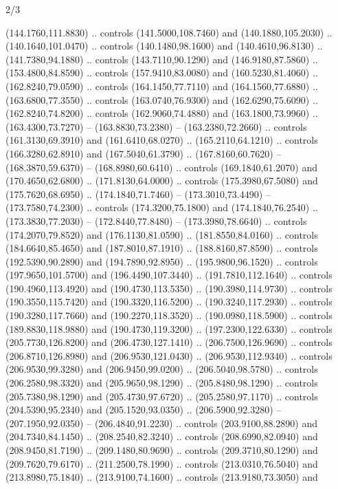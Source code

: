 \begin{flagdescription}{2/3}
\begin{scope}[xshift=0.5\flaglength,yshift=0.5\flagwidth,scale=\stretchfactor]
\begin{scope}[scale=0.001645\flagwidth,yshift=65mm,xshift=-63mm]
\begin{scope}[y=0.80pt, x=0.80pt, yscale=-1,]
\begin{scope}[cm={{1.33333,0.0,0.0,1.33333,(0.0,1e-05)}}]
  (144.1760,111.8830) .. controls (141.5000,108.7460) and (140.1880,105.2030) ..
  (140.1640,101.0470) .. controls (140.1480,98.1600) and (140.4610,96.8130) ..
  (141.7380,94.1880) .. controls (143.7110,90.1290) and (146.9180,87.5860) ..
  (153.4800,84.8590) .. controls (157.9410,83.0080) and (160.5230,81.4060) ..
  (162.8240,79.0590) .. controls (164.1450,77.7110) and (164.1560,77.6880) ..
  (163.6800,77.3550) .. controls (163.0740,76.9300) and (162.6290,75.6090) ..
  (162.8240,74.8200) .. controls (162.9060,74.4880) and (163.1800,73.9960) ..
  (163.4300,73.7270) -- (163.8830,73.2380) -- (163.2380,72.2660) .. controls
  (161.3130,69.3910) and (161.6410,68.0270) .. (165.2110,64.1210) .. controls
  (166.3280,62.8910) and (167.5040,61.3790) .. (167.8160,60.7620) --
  (168.3870,59.6370) -- (168.8980,60.6410) .. controls (169.1840,61.2070) and
  (170.4650,62.6800) .. (171.8130,64.0000) .. controls (175.3980,67.5080) and
  (175.7620,68.6950) .. (174.1840,71.7460) -- (173.3010,73.4490) --
  (173.7580,74.2300) .. controls (174.3200,75.1800) and (174.1840,76.2540) ..
  (173.3830,77.2030) -- (172.8440,77.8480) -- (173.3980,78.6640) .. controls
  (174.2070,79.8520) and (176.1130,81.0590) .. (181.8550,84.0160) .. controls
  (184.6640,85.4650) and (187.8010,87.1910) .. (188.8160,87.8590) .. controls
  (192.5390,90.2890) and (194.7890,92.8950) .. (195.9800,96.1520) .. controls
  (197.9650,101.5700) and (196.4490,107.3440) .. (191.7810,112.1640) .. controls
  (190.4960,113.4920) and (190.4730,113.5350) .. (190.3980,114.9730) .. controls
  (190.3550,115.7420) and (190.3320,116.5200) .. (190.3240,117.2930) .. controls
  (190.3280,117.7660) and (190.2270,118.3520) .. (190.0980,118.5900) .. controls
  (189.8830,118.9880) and (190.4730,119.3200) .. (197.2300,122.6330) .. controls
  (205.7730,126.8200) and (206.4730,127.1410) .. (206.7500,126.9690) .. controls
  (206.8710,126.8980) and (206.9530,121.0430) .. (206.9530,112.9340) .. controls
  (206.9530,99.3280) and (206.9450,99.0200) .. (206.5040,98.5780) .. controls
  (206.2580,98.3320) and (205.9650,98.1290) .. (205.8480,98.1290) .. controls
  (205.7380,98.1290) and (205.4730,97.6720) .. (205.2580,97.1170) .. controls
  (204.5390,95.2340) and (205.1520,93.0350) .. (206.5900,92.3280) --
  (207.1950,92.0350) -- (206.4840,91.2230) .. controls (203.9100,88.2890) and
  (204.7340,84.1450) .. (208.2540,82.3240) .. controls (208.6990,82.0940) and
  (208.9450,81.7190) .. (209.1480,80.9690) .. controls (209.3710,80.1290) and
  (209.7620,79.6170) .. (211.2500,78.1990) .. controls (213.0310,76.5040) and
  (213.8980,75.1840) .. (213.9100,74.1600) .. controls (213.9180,73.3050) and

\end{scope}
\end{scope}
\end{scope}
\end{scope}
\end{flagdescription}
